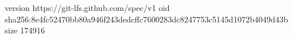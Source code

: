 version https://git-lfs.github.com/spec/v1
oid sha256:8e4fc52470bb80a946f243dedcffc7600283dc8247753c5145d1072b4049d43b
size 174916
